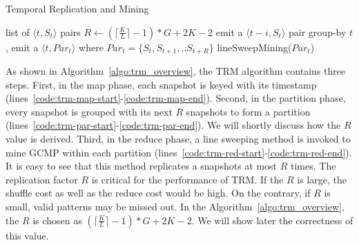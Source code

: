\begin{algorithm}
\caption{Temporal Replication and Mining}
\label{algo:trm_overview}
\begin{algorithmic}[1]
\Require list of $\langle t, S_t \rangle$ pairs
\State $R \gets (\lceil \frac{K}{L} \rceil -1)*G+2K-2$
\label{code:trm-map-start}
		\State emit a $\langle t-i, S_t \rangle$ pair
	\EndFor  
\EndFor
\label{code:trm-map-end}
\label{code:trm-par-start}
\State group-by $t$, emit a $\langle t, Par_t\rangle$
\State where $Par_t = \{S_t, S_{t+1}, .. S_{t+R}\} $
\EndFor
\label{code:trm-par-end}
\label{code:trm-red-start}
\State lineSweepMining($Par_t$)
\label{code:trm-red-end}
\EndFor
\end{algorithmic}
\end{algorithm}

As shown in Algorithm~\ref{algo:trm_overview}, the TRM algorithm contains
three steps. First, in the map phase, each snapshot is keyed 
with its timestamp (lines~\ref{code:trm-map-start}-\ref{code:trm-map-end}). 
Second, in the partition phase, every snapshot is grouped with its next 
$R$ snapshots to form a partition (lines~\ref{code:trm-par-start}-\ref{code:trm-par-end}). 
We will shortly discuss how the $R$ value is derived. 
Third, in the reduce phase, a line sweeping method is invoked 
to mine GCMP within each partition (lines~\ref{code:trm-red-start}-\ref{code:trm-red-end}). 
It is easy to see that this method replicates a snapshots at most $R$ times.
The replication factor $R$ is critical for the performance of TRM.
If the $R$ is large, the shuffle cost as well as the reduce cost would be high. 
On the contrary, if $R$ is small, valid patterns may
be missed out. In the Algorithm~\ref{algo:trm_overview}, the 
$R$ is chosen as $(\lceil \frac{K}{L} \rceil -1)*G+2K-2$. We will show
later the correctness of this value.

